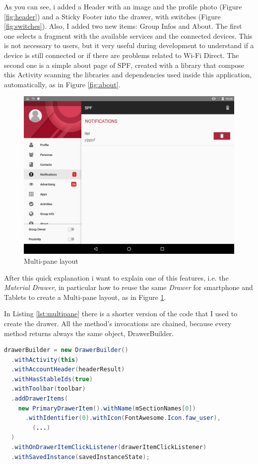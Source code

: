 As you can see, i added a Header with an image and the profile photo (Figure \ref{fig:header}) and a Sticky Footer into the drawer, with switches (Figure \ref{fig:switches}). Also, I added two new items: Group Infos and About. The first one selects a fragment with the available services and the connected devices. This is not necessary to users, but it very useful during development to understand if a device is still connected or if there are problems related to Wi-Fi Direct. The second one is a simple about page of SPF, created with a library that compose this Activity scanning the libraries and dependencies used inside this application, automatically, as in Figure \ref{fig:about}.

\begin{figure}[thpb]
	\centering
	\includegraphics[scale=0.15]{./images/chap3/tablet1.png}
	\caption{Multi-pane layout}
	\label{fig:tablet1}
\end{figure}	


After this quick explanation i want to explain one of this features, i.e. the 	\emph{Material Drawer}, in particular how to reuse the same \emph{Drawer} for smartphone and Tablets to create a Multi-pane layout, as in Figure \ref{fig:tablet1}.

In Listing \ref{lst:multipane} there is a shorter version of the code that I used to create the drawer. All the method's invocations are chained, because every method returns always the same object, DrawerBuilder.


\begin{lstlisting}[caption={DrawerBuilder creations},label=lst:drawerbuilder, language=Java]
drawerBuilder = new DrawerBuilder()
  .withActivity(this)
  .withAccountHeader(headerResult)
  .withHasStableIds(true)
  .withToolbar(toolbar)
  .addDrawerItems(
    new PrimaryDrawerItem().withName(mSectionNames[0])
      .withIdentifier(0).withIcon(FontAwesome.Icon.faw_user),
    	(...)
  )
  .withOnDrawerItemClickListener(drawerItemClickListener)
  .withSavedInstance(savedInstanceState);
\end{lstlisting}


